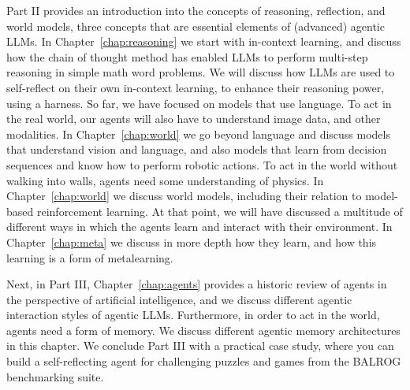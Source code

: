 Part II provides an introduction into the concepts of reasoning, reflection, and world models, three concepts that are essential elements of (advanced) agentic LLMs. %
In Chapter~\ref{chap:reasoning} we start with in-context learning, and discuss how the chain of thought method has enabled LLMs to perform multi-step reasoning in simple math word problems. We will  discuss how LLMs are used to self-reflect on their own in-context learning, to enhance their reasoning power, using a harness. So far, we have focused on  models that use language. To act in the real world, our agents will also have to understand image data, and other modalities. In Chapter~\ref{chap:world} we go beyond language and discuss models that understand vision and language, and also models that learn from decision sequences and know how to perform robotic actions. To act in the world without  walking into walls, agents need some understanding of physics. In Chapter~\ref{chap:world} we  discuss world models, including their relation to model-based reinforcement learning.
At that point, we will have discussed a multitude of different ways in which the agents learn and interact with their environment. In Chapter~\ref{chap:meta} we discuss in more depth how they learn, and how this learning is a form of metalearning.

Next, in Part III,  Chapter~\ref{chap:agents}  provides a historic review of agents in the perspective of artificial intelligence, and we discuss  different agentic interaction styles of agentic LLMs. Furthermore, in order to act in the world, agents need a form of memory. We discuss different agentic memory architectures  in this chapter. We conclude Part III with a practical case study, where you can build a self-reflecting agent for challenging puzzles and games from the BALROG benchmarking suite.

